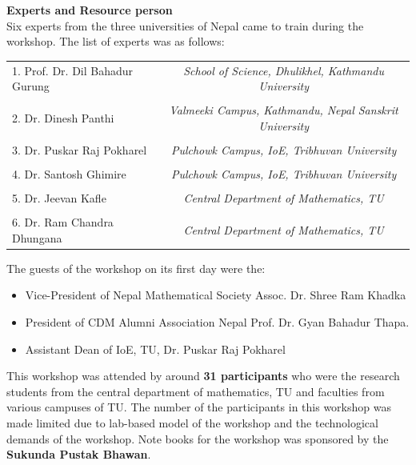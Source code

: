 \documentclass[a4paper,12pt]{report}
\begin{document}
\noindent
{\bfseries \Large Experts and Resource person}\\[3mm]
Six experts from the three universities of Nepal came to train during the workshop. The list of experts was as follows:

\begin{table}[h!]
\centering
  \begin{tcolorbox}[colframe=blue!52, colback=white, width=\linewidth]
\centering  \footnotesize
\begin{tabular}{l||c}

    1. Prof. Dr. Dil Bahadur Gurung &
    \textit{School of Science, Dhulikhel, Kathmandu University}\\
    \\
    2. Dr. Dinesh Panthi &
    \textit{Valmeeki Campus, Kathmandu, Nepal Sanskrit University}\\
    \\
    3. Dr. Puskar Raj Pokharel &
    \textit{Pulchowk Campus, IoE, Tribhuvan University}\\
    \\
    4. Dr. Santosh Ghimire&
    \textit{Pulchowk Campus, IoE, Tribhuvan University}\\
    \\
    5. Dr. Jeevan Kafle &
    \textit{Central Department of Mathematics, TU}\\
    \\
    6. Dr. Ram Chandra Dhungana &
    \textit{Central Department of Mathematics, TU}\\
    \end{tabular}
  \end{tcolorbox}
\end{table}

\noindent
The guests of the workshop on its first day were the:
\begin{itemize}
\item Vice-President of Nepal Mathematical Society Assoc. Dr. Shree Ram Khadka
\item President of CDM Alumni Association Nepal Prof. Dr. Gyan Bahadur Thapa.
\item Assistant Dean of IoE, TU, Dr. Puskar Raj Pokharel
\end{itemize}

\noindent
This workshop was attended by around \textbf{31 participants} who were the research students from the central department of mathematics, TU and faculties from various campuses of TU. The number of the participants in this workshop was made limited due to lab-based model of the workshop and the technological demands of the workshop. Note books for the workshop was sponsored by the \textbf{Sukunda Pustak Bhawan}.
\end{document}
